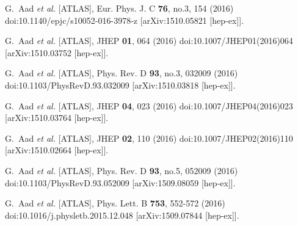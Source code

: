 \begin{thebibliography}{9}
G.~Aad \textit{et al.} [ATLAS],
Eur. Phys. J. C \textbf{76}, no.3, 154 (2016)
doi:10.1140/epjc/s10052-016-3978-z
[arXiv:1510.05821 [hep-ex]].

G.~Aad \textit{et al.} [ATLAS],
JHEP \textbf{01}, 064 (2016)
doi:10.1007/JHEP01(2016)064
[arXiv:1510.03752 [hep-ex]].

G.~Aad \textit{et al.} [ATLAS],
Phys. Rev. D \textbf{93}, no.3, 032009 (2016)
doi:10.1103/PhysRevD.93.032009
[arXiv:1510.03818 [hep-ex]].

G.~Aad \textit{et al.} [ATLAS],
JHEP \textbf{04}, 023 (2016)
doi:10.1007/JHEP04(2016)023
[arXiv:1510.03764 [hep-ex]].

G.~Aad \textit{et al.} [ATLAS],
JHEP \textbf{02}, 110 (2016)
doi:10.1007/JHEP02(2016)110
[arXiv:1510.02664 [hep-ex]].

G.~Aad \textit{et al.} [ATLAS],
Phys. Rev. D \textbf{93}, no.5, 052009 (2016)
doi:10.1103/PhysRevD.93.052009
[arXiv:1509.08059 [hep-ex]].

G.~Aad \textit{et al.} [ATLAS],
Phys. Lett. B \textbf{753}, 552-572 (2016)
doi:10.1016/j.physletb.2015.12.048
[arXiv:1509.07844 [hep-ex]].


\end{thebibliography}

